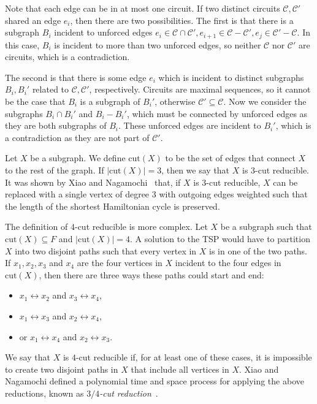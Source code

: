 Note that each edge can be in at most one circuit. If two distinct circuits $\mathcal{C}, \mathcal{C}'$ shared an edge $e_i$, then there are two possibilities. The first is that there is a subgraph $B_i$ incident to unforced edges $e_i \in \mathcal{C} \cap \mathcal{C}', e_{i+1} \in \mathcal{C} - \mathcal{C}', e_j \in \mathcal{C}' - \mathcal{C}$. In this case, $B_i$ is incident to more than two unforced edges, so neither $\mathcal{C}$ nor $\mathcal{C}'$ are circuits, which is a contradiction.

The second is that there is some edge $e_i$ which is incident to distinct subgraphs $B_i, B_i'$ related to $\mathcal{C}, \mathcal{C}'$, respectively. Circuits are maximal sequences, so it cannot be the case that $B_i$ is a subgraph of $B_i'$, otherwise $\mathcal{C}' \subseteq \mathcal{C}$. Now we consider the subgraphs $B_i \cap B_i'$ and $B_i - B_i'$, which must be connected by unforced edges as they are both subgraphs of $B_i$. These unforced edges are incident to $B_i'$, which is a contradiction as they are not part of $\mathcal{C}'$.

Let $X$ be a subgraph. We define $\text{cut}(X)$ to be the set of edges that connect $X$ to the rest of the graph. If $|\text{cut}(X)| = 3$, then we say that $X$ is $3$-cut reducible. It was shown by Xiao and Nagamochi~\cite{xiao2016degree3} that, if $X$ is 3-cut reducible, $X$ can be replaced with a single vertex of degree $3$ with outgoing edges weighted such that the length of the shortest Hamiltonian cycle is preserved.

The definition of $4$-cut reducible is more complex. Let $X$ be a subgraph such that $\text{cut}(X) \subseteq F$ and $|\text{cut}(X)| = 4$. A solution to the TSP would have to partition $X$ into two disjoint paths such that every vertex in $X$ is in one of the two paths. If $x_1, x_2, x_3$ and $x_4$ are the four vertices in $X$ incident to the four edges in $\text{cut}(X)$, then there are three ways these paths could start and end:
%
\begin{itemize}
\item $x_1 \leftrightarrow x_2$ and $x_3 \leftrightarrow x_4$,
\item $x_1 \leftrightarrow x_3$ and $x_2 \leftrightarrow x_4$,
\item or $x_1 \leftrightarrow x_4$ and $x_2 \leftrightarrow x_3$.
\end{itemize}
%
We say that $X$ is $4$-cut reducible if, for at least one of these cases, it is impossible to create two disjoint paths in $X$ that include all vertices in $X$. Xiao and Nagamochi defined a polynomial time and space process for applying the above reductions, known as {\em $3/4$-cut reduction}~\cite{xiao2016degree3}.

